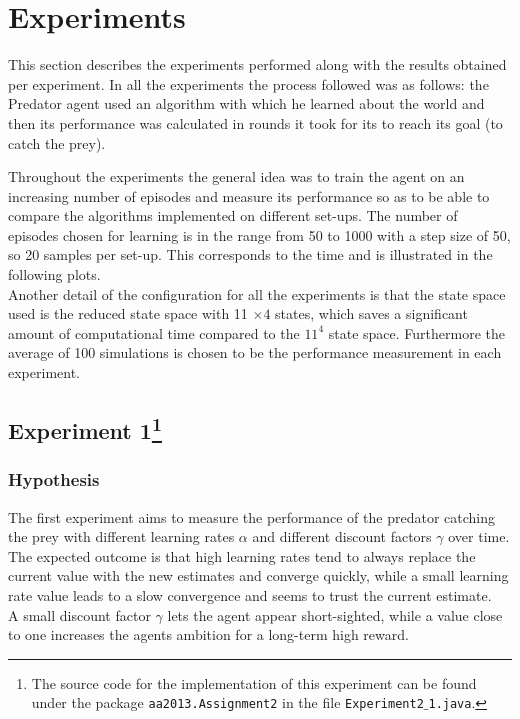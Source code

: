 \documentclass[11pt]{article}
\begin{document}
\section{Experiments}
This section describes the experiments performed along with the results obtained per experiment. In all the experiments the process followed was as follows: the Predator agent used an algorithm with which he learned about the world and then its performance was calculated in rounds it took for its to reach its goal (to catch the prey).

Throughout the experiments the general idea was to train the agent on an increasing number of episodes and measure its performance so as to be able to compare the algorithms implemented on different set-ups. The number of episodes chosen for learning is in the range from 50 to 1000 with a step size of 50, so 20 samples per set-up. This corresponds to the time and is illustrated in the following plots.\\
Another detail of the configuration for all the experiments is that the state space used is the reduced state space with 11 $\times4$ states, which saves a significant amount of computational time compared to the $11^4$ state space. Furthermore the average  of 100 simulations is chosen to be the performance measurement in each experiment.


\subsection[title] {Experiment 1\footnote{The source code for the implementation of this experiment can be found under the package \texttt{aa2013.Assignment2} in the file \texttt{Experiment2$\_$1.java}.}}




\subsubsection{Hypothesis}
The first experiment aims to measure the performance of the predator catching the prey with different learning rates $\alpha$ and different discount factors $\gamma$ over time.\\
The expected outcome is that high learning rates tend to always replace the current value with the new estimates and converge quickly, while a small learning rate value leads to a slow convergence and seems to trust the current estimate. ~\cite{dar}\\
A small discount factor $\gamma$ lets the agent appear short-sighted, while a value close to one increases the agents ambition for a long-term high reward.
\end{document}
